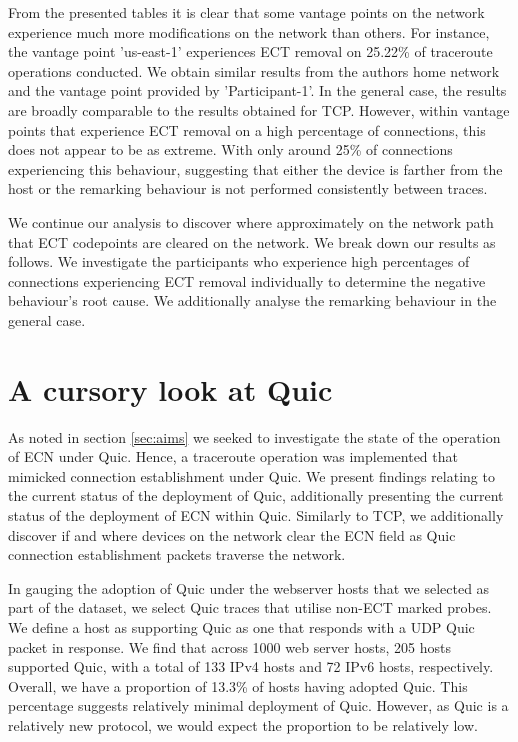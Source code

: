 \documentclass{l4proj}
\begin{document}
From the presented tables it is clear that some vantage points on the network experience much more modifications on the network than others. For instance, the vantage point 'us-east-1' experiences ECT removal on 25.22\% of traceroute operations conducted. We obtain similar results from the authors home network and the vantage point provided by 'Participant-1'. In the general case, the results are broadly comparable to the results obtained for TCP. However, within vantage points that experience ECT removal on a high percentage of connections, this does not appear to be as extreme. With only around 25\% of connections experiencing this behaviour, suggesting that either the device is farther from the host or the remarking behaviour is not performed consistently between traces.

We continue our analysis to discover where approximately on the network path that ECT codepoints are cleared on the network. We break down our results as follows. We investigate the participants who experience high percentages of connections experiencing ECT removal individually to determine the negative behaviour's root cause. We additionally analyse the remarking behaviour in the general case.



\section{A cursory look at Quic}

As noted in section \ref{sec:aims} we seeked to investigate the state of the operation of ECN under Quic. Hence, a traceroute operation was implemented that mimicked connection establishment under Quic. We present findings relating to the current status of the deployment of Quic, additionally presenting the current status of the deployment of ECN within Quic. Similarly to TCP, we additionally discover if and where devices on the network clear the ECN field as Quic connection establishment packets traverse the network.

In gauging the adoption of Quic under the webserver hosts that we selected as part of the dataset, we select Quic traces that utilise non-ECT marked probes. We define a host as supporting Quic as one that responds with a UDP Quic packet in response. We find that across 1000 web server hosts, 205 hosts supported Quic, with a total of 133 IPv4 hosts and 72 IPv6 hosts, respectively. Overall, we have a proportion of 13.3\% of hosts having adopted Quic. This percentage suggests relatively minimal deployment of Quic. However, as Quic is a relatively new protocol, we would expect the proportion to be relatively low.
\end{document}
